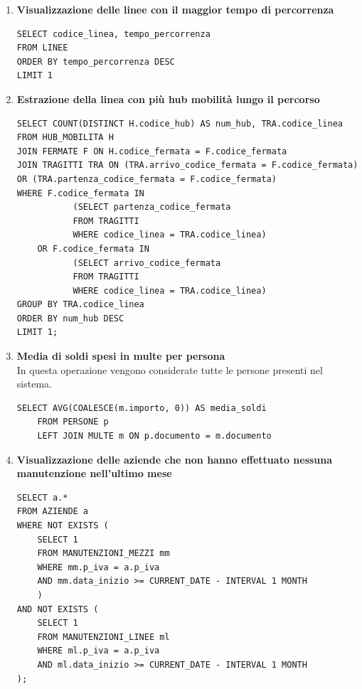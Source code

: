 \documentclass[12pt,a4paper]{report}
\begin{document}
\begin{enumerate}[label=\textbf{\arabic*)}]
\item \textbf{Visualizzazione delle linee con il maggior tempo di percorrenza} \\
\begin{lstlisting}[style=sqlstyle, caption=Query for Line with Maximum Tempo Percorrenza]
SELECT codice_linea, tempo_percorrenza
FROM LINEE
ORDER BY tempo_percorrenza DESC
LIMIT 1
\end{lstlisting}

\item \textbf{Estrazione della linea con più hub mobilità lungo il percorso} \\
\begin{lstlisting}[style=sqlstyle]
SELECT COUNT(DISTINCT H.codice_hub) AS num_hub, TRA.codice_linea
FROM HUB_MOBILITA H
JOIN FERMATE F ON H.codice_fermata = F.codice_fermata
JOIN TRAGITTI TRA ON (TRA.arrivo_codice_fermata = F.codice_fermata) OR (TRA.partenza_codice_fermata = F.codice_fermata)
WHERE F.codice_fermata IN
           (SELECT partenza_codice_fermata
           FROM TRAGITTI
           WHERE codice_linea = TRA.codice_linea)
    OR F.codice_fermata IN
           (SELECT arrivo_codice_fermata
           FROM TRAGITTI
           WHERE codice_linea = TRA.codice_linea)
GROUP BY TRA.codice_linea
ORDER BY num_hub DESC
LIMIT 1;
\end{lstlisting}

\item \textbf{Media di soldi spesi in multe per persona} \\
In questa operazione vengono considerate tutte le persone presenti nel sistema.
\begin{lstlisting}[style=sqlstyle, caption=Query for Average Fine Amount Grouped by Documento]
SELECT AVG(COALESCE(m.importo, 0)) AS media_soldi
    FROM PERSONE p
    LEFT JOIN MULTE m ON p.documento = m.documento
\end{lstlisting}

\item \textbf{Visualizzazione delle aziende che non hanno effettuato nessuna manutenzione nell’ultimo mese} \\
\begin{lstlisting}[style=sqlstyle, caption=Query for Companies Without Maintenance in Last Month]
SELECT a.*
FROM AZIENDE a
WHERE NOT EXISTS (
    SELECT 1
    FROM MANUTENZIONI_MEZZI mm
    WHERE mm.p_iva = a.p_iva
    AND mm.data_inizio >= CURRENT_DATE - INTERVAL 1 MONTH
    )
AND NOT EXISTS (
    SELECT 1
    FROM MANUTENZIONI_LINEE ml
    WHERE ml.p_iva = a.p_iva
    AND ml.data_inizio >= CURRENT_DATE - INTERVAL 1 MONTH
);
\end{lstlisting}


\end{enumerate}
\end{document}

